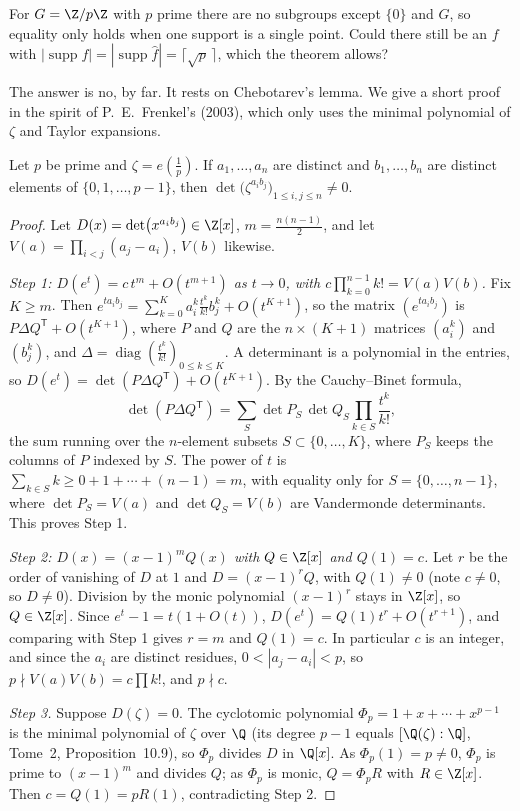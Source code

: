 \begin{think}
For $G=\Z/p\Z$ with $p$ prime there are no subgroups except $\{0\}$ and $G$, so equality only holds when one support is a single
point. Could there still be an $f$ with $|\operatorname{supp}f|=|\operatorname{supp}\hat f|=\lceil\sqrt p\,\rceil$, which the theorem allows?
\end{think}

The answer is no, by far. It rests on Chebotarev's lemma. We give a short proof in the spirit of P.~E.~Frenkel's (2003), which only uses
the minimal polynomial of $\zeta$ and Taylor expansions.

\begin{lemma}[Chebotarev, 1926]\label{lem:chebotarev}
Let $p$ be prime and $\zeta=e(\frac1p)$. If $a_1,\dots,a_n$ are distinct and $b_1,\dots,b_n$ are distinct elements of $\{0,1,\dots,p-1\}$,
then $\det\bigl(\zeta^{a_ib_j}\bigr)_{1\le i,j\le n}\ne0$.
\end{lemma}
\begin{proof}
Let $D(x)=\det\bigl(x^{a_ib_j}\bigr)\in\Z[x]$, $m=\frac{n(n-1)}2$, and let $V(a)=\prod_{i<j}(a_j-a_i)$, $V(b)$ likewise.

\emph{Step 1: $D(e^t)=c\,t^m+O(t^{m+1})$ as $t\to0$, with $c\prod_{k=0}^{n-1}k!=V(a)V(b)$.} Fix $K\ge m$. Then
$e^{ta_ib_j}=\sum_{k=0}^Ka_i^k\frac{t^k}{k!}b_j^k+O(t^{K+1})$, so the matrix $(e^{ta_ib_j})$ is $P\Delta Q^{\mathsf T}+O(t^{K+1})$, where $P$ and $Q$ are the
$n\times(K+1)$ matrices $(a_i^k)$ and $(b_j^k)$, and $\Delta=\operatorname{diag}(\frac{t^k}{k!})_{0\le k\le K}$. A determinant is a polynomial in the
entries, so $D(e^t)=\det(P\Delta Q^{\mathsf T})+O(t^{K+1})$. By the Cauchy--Binet formula,
\[\det(P\Delta Q^{\mathsf T})=\sum_{S}\det P_S\,\det Q_S\prod_{k\in S}\frac{t^k}{k!},\]
the sum running over the $n$-element subsets $S\subset\{0,\dots,K\}$, where $P_S$ keeps the columns of $P$ indexed by $S$. The power of $t$ is
$\sum_{k\in S}k\ge0+1+\cdots+(n-1)=m$, with equality only for $S=\{0,\dots,n-1\}$, where $\det P_S=V(a)$ and $\det Q_S=V(b)$ are Vandermonde
determinants. This proves Step 1.

\emph{Step 2: $D(x)=(x-1)^mQ(x)$ with $Q\in\Z[x]$ and $Q(1)=c$.} Let $r$ be the order of vanishing of $D$ at $1$ and $D=(x-1)^rQ$, with
$Q(1)\ne0$ (note $c\ne0$, so $D\ne0$). Division by the monic polynomial $(x-1)^r$ stays in $\Z[x]$, so $Q\in\Z[x]$. Since
$e^t-1=t(1+O(t))$, $D(e^t)=Q(1)t^r+O(t^{r+1})$, and comparing with Step 1 gives $r=m$ and $Q(1)=c$. In particular $c$ is an integer, and since
the $a_i$ are distinct residues, $0<|a_j-a_i|<p$, so $p\nmid V(a)V(b)=c\prod k!$, and $p\nmid c$.

\emph{Step 3.} Suppose $D(\zeta)=0$. The cyclotomic polynomial $\Phi_p=1+x+\cdots+x^{p-1}$ is the minimal polynomial of $\zeta$ over $\Q$
(its degree $p-1$ equals $[\Q(\zeta):\Q]$, Tome~2, Proposition~10.9), so $\Phi_p$ divides $D$ in $\Q[x]$. As $\Phi_p(1)=p\ne0$, $\Phi_p$ is prime to
$(x-1)^m$ and divides $Q$; as $\Phi_p$ is monic, $Q=\Phi_pR$ with $R\in\Z[x]$. Then $c=Q(1)=pR(1)$, contradicting Step 2.
\end{proof}

